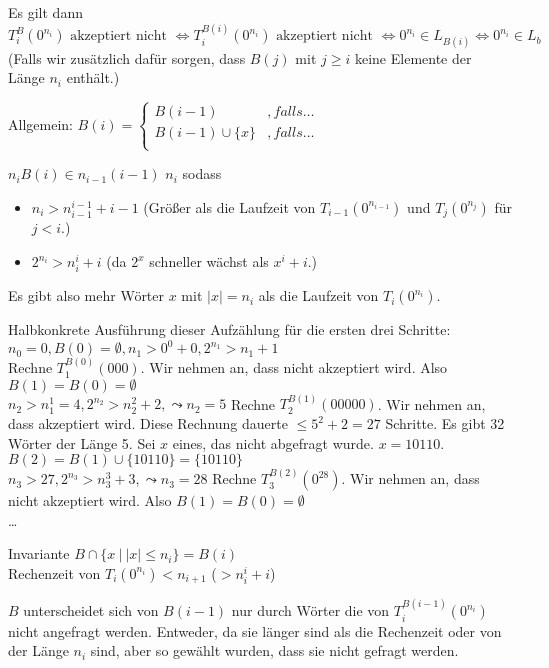 \begin{beweis}
    Es gilt dann $T_i^B(0^{n_i}) \text{ akzeptiert nicht } \Leftrightarrow T_i^{B(i)}(0^{n_i}) \text{ akzeptiert nicht } \Leftrightarrow 0^{n_i} \in L_{B(i)} \Leftrightarrow 0^{n_i} \in L_b$ (Falls wir zusätzlich dafür sorgen, dass $B(j)$ mit $j \geq i$ keine Elemente der Länge $n_i$ enthält.)

    Allgemein:
    $ B(i) =
    \begin{cases}
        B(i-1)              & , falls \dots     \\
        B(i-1) \cup \{x\}   & , falls \dots     \\
    \end{cases}
    $

    $n_i B(i) \in n_{i-1}(i-1)$
    $n_i$ sodass
    \begin{itemize}
        \item $n_i > n_{i-1}^{i-1} + i-1$ (Größer als die Laufzeit von $T_{i-1}(0^{n_{i-1}})$ und $T_j(0^{n_j})$ für $j < i$.)
        \item $2^{n_i} > n_i^i + i$ (da $2^x$ schneller wächst als $x^i+i$.)
    \end{itemize}
    Es gibt also mehr Wörter $x$ mit $|x| = n_i$ als die Laufzeit von $T_{i}(0^{n_i})$.

    Halbkonkrete Ausführung dieser Aufzählung für die ersten drei Schritte:
    \\
    $n_0 = 0, B(0) = \emptyset, n_1 > 0^0 + 0, 2^{n_1} > n_1 + 1$
    \\
    Rechne $T_1^{B(0)}(000)$. Wir nehmen an, dass nicht akzeptiert wird. Also $B(1) = B(0) = \emptyset$
    \\
    $n_2 > n_1^1 = 4, 2^{n_2} > n_2^2 + 2, \leadsto n_2 = 5$
    Rechne $T_2^{B(1)}(00000)$. Wir nehmen an, dass akzeptiert wird. Diese Rechnung dauerte $\leq 5^2 + 2 = 27$ Schritte. Es gibt 32 Wörter der Länge 5. Sei $x$ eines, das nicht abgefragt wurde. $x = 10110$. $B(2) = B(1) \cup \{10110\} = \{10110\}$
    \\
    $n_3 > 27, 2^{n_3} > n_3^3 + 3, \leadsto n_3 = 28$
    Rechne $T_3^{B(2)}(0^{28})$. Wir nehmen an, dass nicht akzeptiert wird. Also $B(1) = B(0) = \emptyset$
    \\
    \dots

    Invariante $B \cap \{ x \ |\  |x| \leq n_i \}  = B(i)$
    \\
    Rechenzeit von $T_i(0^{n_i}) < n_{i+1}$ ($> n_i^i + i$)

    $B$ unterscheidet sich von $B(i-1)$ nur durch Wörter die von $T_i^{B(i-1)}(0^{n_i})$ nicht angefragt werden. Entweder, da sie länger sind als die Rechenzeit oder von der Länge $n_i$ sind, aber so gewählt wurden, dass sie nicht gefragt werden.


\end{beweis}
